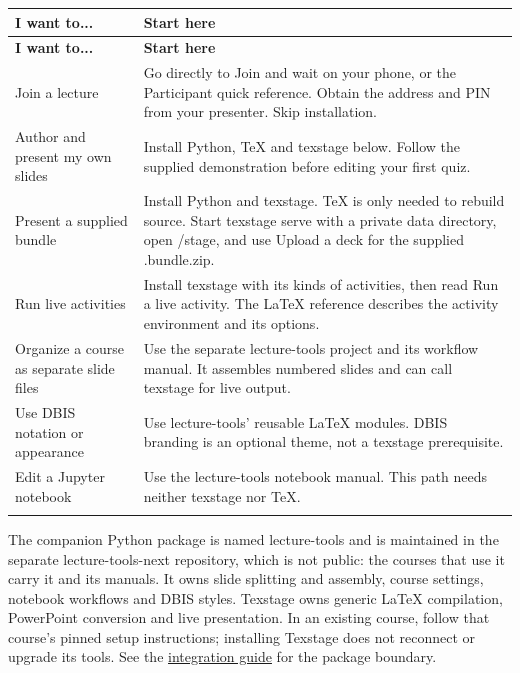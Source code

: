 \documentclass[a4paper,11pt]{article}
\begin{document}
\label{sec:choose-your-starting-path}
{\small
\begin{longtable}{>{\raggedright\arraybackslash}p{}>{\raggedright\arraybackslash}p{}}
\toprule
\textbf{I want to.\allowbreak{}.\allowbreak{}.} & \textbf{Start here} \\
\midrule
\endfirsthead
\toprule
\textbf{I want to.\allowbreak{}.\allowbreak{}.} & \textbf{Start here} \\
\midrule
\endhead
\midrule
\endfoot
\bottomrule
\endlastfoot
Join a lecture & Go directly to Join and wait on your phone, or the Participant quick reference.\allowbreak{} Obtain the address and PIN from your presenter.\allowbreak{} Skip installation. \\ \addlinespace[3pt]
Author and present my own slides & Install Python, TeX and texstage below.\allowbreak{} Follow the supplied demonstration before editing your first quiz. \\ \addlinespace[3pt]
Present a supplied bundle & Install Python and texstage.\allowbreak{} TeX is only needed to rebuild source.\allowbreak{} Start texstage serve with a private data directory, open /\allowbreak{}stage, and use Upload a deck for the supplied .\allowbreak{}bundle.\allowbreak{}zip. \\ \addlinespace[3pt]
Run live activities & Install texstage with its kinds of activities, then read Run a live activity.\allowbreak{} The LaTeX reference describes the activity environment and its options. \\ \addlinespace[3pt]
Organize a course as separate slide files & Use the separate lecture-\allowbreak{}tools project and its workflow manual.\allowbreak{} It assembles numbered slides and can call texstage for live output. \\ \addlinespace[3pt]
Use DBIS notation or appearance & Use lecture-\allowbreak{}tools' reusable LaTeX modules.\allowbreak{} DBIS branding is an optional theme, not a texstage prerequisite. \\ \addlinespace[3pt]
Edit a Jupyter notebook & Use the lecture-\allowbreak{}tools notebook manual.\allowbreak{} This path needs neither texstage nor TeX. \\ \addlinespace[3pt]
\end{longtable}}

The companion Python package is named lecture-\allowbreak{}tools and is maintained in the separate lecture-\allowbreak{}tools-\allowbreak{}next repository, which is not public: the courses that use it carry it and its manuals.\allowbreak{} It owns slide splitting and assembly, course settings, notebook workflows and DBIS styles.\allowbreak{} Texstage owns generic LaTeX compilation, PowerPoint conversion and live presentation.\allowbreak{} In an existing course, follow that course's pinned setup instructions; installing Texstage does not reconnect or upgrade its tools.\allowbreak{} See the \href{\manualdocroot integration.md}{integration guide} for the package boundary.\par
\end{document}
